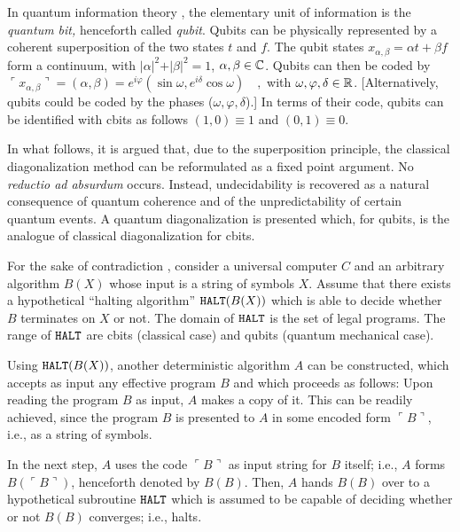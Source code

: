 \documentclass[prl,preprint,showpacs,showkeys,amsfonts,amsmath]{revtex4}
\begin{document}
In quantum information theory \cite{Gruska,nielsen-book},
the elementary unit of information is
 the {\em quantum bit,}
henceforth called {\em qubit}.
Qubits can be physically represented by a coherent
superposition
of the two states $t$ and $f$.
The qubit states
$
x_{\alpha ,\beta}  =\alpha t+\beta f
$
form a continuum, with
$ \vert \alpha \vert^2+\vert \beta \vert^2=1$, $\alpha ,\beta \in {\Bbb
C}$. Qubits can then be coded by
$
\ulcorner
x_{\alpha ,\beta }\urcorner  =(\alpha ,\beta )=
e^{i\varphi } (\sin \omega  ,e^{i\delta } \cos \omega )\quad ,
$
with
$\omega ,\varphi ,\delta \in {\Bbb R}$.
[Alternatively, qubits could be coded by the phases ($\omega ,\varphi ,\delta $).]
In terms of their code, qubits can be identified with cbits as follows
$
(1,0)\equiv 1$
and
$
(0,1)\equiv 0$.


In what follows, it is argued that, due to the superposition principle,
the classical diagonalization method can be reformulated as a fixed point argument.
No {\em reductio ad absurdum} occurs. Instead, undecidability is
recovered as a natural consequence of quantum coherence and of the
unpredictability of certain quantum events.
A quantum diagonalization is presented which, for qubits,
is the analogue of classical diagonalization for cbits.




For the sake of contradiction \cite{rogers1,odi:89},
consider a universal computer $C$ and an arbitrary algorithm
$B(X)$ whose input is a string of symbols $X$.  Assume that there exists
a hypothetical ``halting algorithm'' ${\tt HALT}(B(X))$ which is able to decide whether $B$
terminates on $X$ or not.
The domain of ${\tt HALT}$  is the set of legal programs.
The range of ${\tt HALT}$ are cbits (classical case) and qubits (quantum
mechanical case).

Using ${\tt HALT}(B(X))$,  another deterministic
algorithm  $A$ can be constructed, which accepts as input any effective program $B$ and
which proceeds as follows:  Upon reading the program $B$ as input, $A$
makes a copy of it.  This can be readily achieved, since the program $B$
is presented to $A$ in some encoded form
$\ulcorner B\urcorner $,
i.e., as a string of
symbols.

In the next step, $A$ uses the code
$\ulcorner B\urcorner $
 as input
string for $B$ itself; i.e., $A$ forms  $B(\ulcorner B\urcorner )$,
henceforth denoted by
$B(B)$.
Then, $A$ hands $B(B)$ over to a hypothetical subroutine ${\tt HALT}$
which is assumed to be capable of deciding whether or not $B(B)$ converges; i.e., halts.
\end{document}
